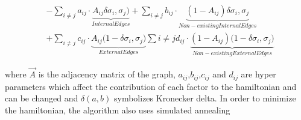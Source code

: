 \begin{itemize}
\begin{align*}
\label{eqn:hamiltonian}
&-\sum_{i\neq j} a_{ij}\cdot \underbrace{A_{ij} \delta{\sigma_i,\sigma_j)}}_{Internal Edges}
+\sum_{i\neq j} b_{ij}\cdot \underbrace{(1-A_{ij}) \delta{\sigma_i,\sigma_j}}_{Non-existing Internal Edges}\\&
+\sum_{i\neq j} c_{ij}\cdot \underbrace{A_{ij} (1-\delta{\sigma_i,\sigma_j)}}_{External Edges} 
\sum{i\neq j} d_{ij}\cdot \underbrace{(1-A_{ij}) (1-\delta{\sigma_i,\sigma_j)}}_{Non-existing External Edges}
\end{align*}

where $\vec{A}$ is the adjacency matrix of the graph, $a_{ij}$,$b_{ij}$,$c_{ij}$ and $d_{ij}$ are hyper parameters which affect the contribution of each factor to the hamiltonian and can be changed and $\delta(a,b)$ symbolizes Kronecker delta.
In order to minimize the hamiltonian, the algorithm also uses simulated annealing\cite{10.5555/800044.801546}

\end{itemize}

